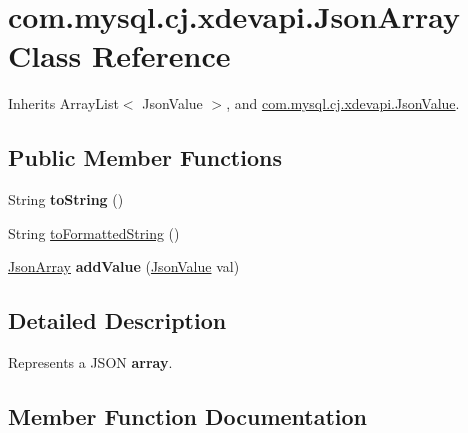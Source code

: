 \hypertarget{classcom_1_1mysql_1_1cj_1_1xdevapi_1_1_json_array}{}\section{com.\+mysql.\+cj.\+xdevapi.\+Json\+Array Class Reference}
\label{classcom_1_1mysql_1_1cj_1_1xdevapi_1_1_json_array}


Inherits Array\+List$<$ Json\+Value $>$, and \mbox{\hyperlink{interfacecom_1_1mysql_1_1cj_1_1xdevapi_1_1_json_value}{com.\+mysql.\+cj.\+xdevapi.\+Json\+Value}}.

\subsection*{Public Member Functions}
\begin{DoxyCompactItemize}
\item 
\mbox{\label{classcom_1_1mysql_1_1cj_1_1xdevapi_1_1_json_array_ac8d01d1367f93b168dd760316a66d5fc}} 
String {\bfseries to\+String} ()
\item 
String \mbox{\hyperlink{classcom_1_1mysql_1_1cj_1_1xdevapi_1_1_json_array_a8a735ca15493e8154b46976ffb56204e}{to\+Formatted\+String}} ()
\item 
\mbox{\label{classcom_1_1mysql_1_1cj_1_1xdevapi_1_1_json_array_ac85f74cda36896e22b0970d9768c738d}} 
\mbox{\hyperlink{classcom_1_1mysql_1_1cj_1_1xdevapi_1_1_json_array}{Json\+Array}} {\bfseries add\+Value} (\mbox{\hyperlink{interfacecom_1_1mysql_1_1cj_1_1xdevapi_1_1_json_value}{Json\+Value}} val)
\end{DoxyCompactItemize}


\subsection{Detailed Description}
Represents a J\+S\+ON {\bfseries array}. 

\subsection{Member Function Documentation}
\mbox{\label{classcom_1_1mysql_1_1cj_1_1xdevapi_1_1_json_array_a8a735ca15493e8154b46976ffb56204e}} 
